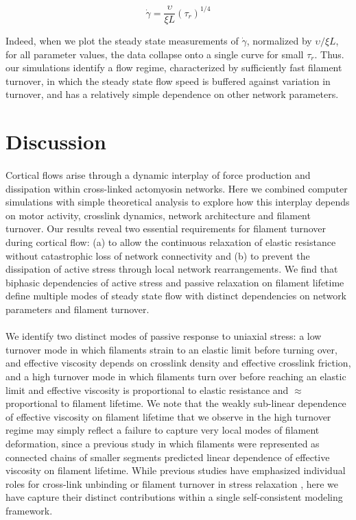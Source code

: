 \begin{equation}
	\label{eqn:flow_scaling_eq}
	\dot{\gamma} = \frac{\upsilon}{\xi L}  \left ( \tau_r \right ) ^{1/4}
\end{equation}

Indeed, when we plot the steady state measurements of $\dot{\gamma}$, normalized by $\upsilon/\xi L$,  for all parameter values, the data collapse onto a single curve for small $\tau_r$.  Thus. our simulations identify a flow regime, characterized by sufficiently fast filament turnover, in which the steady state flow speed is buffered against variation in turnover, and has a relatively simple dependence on other network parameters.



\section*{Discussion}

\paragraph{} Cortical flows arise through a dynamic interplay of force production and dissipation within cross-linked actomyosin networks. Here we combined computer simulations with simple theoretical analysis to explore how this interplay depends on motor activity, crosslink dynamics, network architecture and filament turnover. Our results reveal two essential requirements for filament turnover during cortical flow:  (a) to allow the continuous relaxation of elastic resistance without catastrophic loss of network connectivity and (b) to prevent the dissipation of active stress through local network rearrangements. We find that biphasic dependencies of active stress and passive relaxation on filament lifetime define multiple modes of steady state flow with distinct dependencies on network parameters and filament turnover.


\paragraph{} We identify two distinct modes of passive response to uniaxial stress:  a low turnover mode in which filaments strain to an elastic limit before turning over, and effective viscosity depends on crosslink density and effective crosslink friction, and a high turnover mode in which filaments turn over before reaching an elastic limit and effective viscosity is proportional to elastic resistance and $\approx$ proportional to filament lifetime. We note that the weakly sub-linear dependence of effective viscosity on filament lifetime that we observe in the high turnover regime may simply reflect a failure to capture very local modes of filament deformation, since a previous study \cite{Kim2014526} in which filaments were represented as connected chains of smaller segments predicted linear dependence of effective viscosity on filament lifetime. While previous studies have emphasized individual roles for cross-link unbinding or filament turnover in stress relaxation \cite{De-La-Cruz:2015aa,De-La-Cruz:2009aa,Salbreux2012536}, here we have capture their distinct contributions within a single self-consistent modeling framework. 

